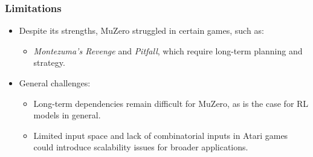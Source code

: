 \subsubsection*{Limitations}
\begin{itemize}
    \item Despite its strengths, MuZero struggled in certain games, such as:
    \begin{itemize}
        \item \emph{Montezuma's Revenge} and \emph{Pitfall}, which require long-term planning and strategy.
    \end{itemize}
    \item General challenges:
    \begin{itemize}
        \item Long-term dependencies remain difficult for MuZero, as is the case for RL models in general.
        \item Limited input space and lack of combinatorial inputs in Atari games could introduce scalability issues for broader applications.
    \end{itemize}
\end{itemize}

